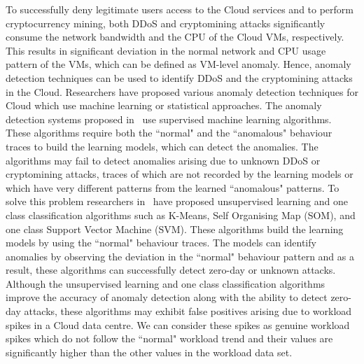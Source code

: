 To successfully deny legitimate users access to the Cloud services and to perform cryptocurrency mining, both DDoS and cryptomining attacks significantly consume the network bandwidth and the CPU of the Cloud VMs, respectively. This results in significant deviation in the normal network and CPU usage pattern of the VMs, which can be defined as VM-level anomaly. Hence, anomaly detection techniques can be used to identify DDoS and the cryptomining attacks in the Cloud. Researchers have proposed various anomaly detection techniques for Cloud which use machine learning or statistical approaches. The anomaly detection systems proposed in~\cite{ml_based:2012, Pandeeswari2016, ML_based_ids:2016} use supervised machine learning algorithms. These algorithms require both the ``normal" and the ``anomalous" behaviour traces to build the learning models, which can detect the anomalies. 
The algorithms may fail to detect anomalies arising due to unknown DDoS or cryptomining attacks, traces of which are not recorded by the learning models or which have very different patterns from the learned ``anomalous" patterns. To solve this problem researchers in~\cite{automated-detection:2016, UBL:2012, cloud-malware:2016} have proposed unsupervised learning and one class classification algorithms such as K-Means, Self Organising Map (SOM), and one class Support Vector Machine (SVM). 
These algorithms build the learning models by using the ``normal" behaviour traces. The models can identify anomalies by observing the deviation in the ``normal" behaviour pattern and as a result, these algorithms can successfully detect zero-day or unknown attacks.
Although the unsupervised learning and one class classification algorithms improve the accuracy of anomaly detection along with the ability to detect zero-day attacks, these algorithms may exhibit false positives arising due to workload spikes in a Cloud data centre. We can consider these spikes as genuine workload spikes which do not follow the ``normal" workload trend and their values are significantly higher than the other values in the workload data set. 
